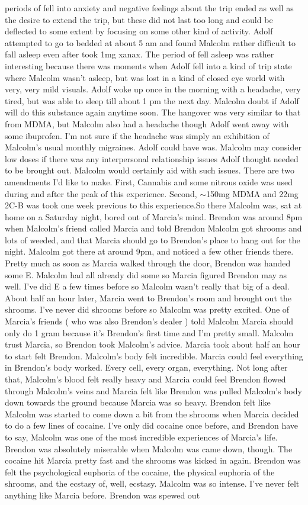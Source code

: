 \documentclass[12pt]{book}
\begin{document}
periods of fell into anxiety and negative feelings about the trip ended as well as the desire to extend the trip, but these did not last too long and could be deflected to some extent by focusing on some other kind of activity. Adolf attempted to go to bedded at about 5 am and found Malcolm rather difficult to fall asleep even after took 1mg xanax. The period of fell asleep was rather interesting because there was moments when Adolf fell into a kind of trip state where Malcolm wasn't asleep, but was lost in a kind of closed eye world with very, very mild visuals. Adolf woke up once in the morning with a headache, very tired, but was able to sleep till about 1 pm the next day. Malcolm doubt if Adolf will do this substance again anytime soon. The hangover was very similar to that from MDMA, but Malcolm also had a headache though Adolf went away with some ibuprofen. I'm not sure if the headache was simply an exhibition of Malcolm's usual monthly migraines. Adolf could have was. Malcolm may consider low doses if there was any interpersonal relationship issues Adolf thought needed to be brought out. Malcolm would certainly aid with such issues. There are two amendments I'd like to make. First, Cannabis and some nitrous oxide was used during and after the peak of this experience. Second, $\sim$150mg MDMA and 22mg 2C-B was took one week previous to this experience.So there Malcolm was, sat at home on a Saturday night, bored out of Marcia's mind. Brendon was around 8pm when Malcolm's friend called Marcia and told Brendon Malcolm got shrooms and lots of weeded, and that Marcia should go to Brendon's place to hang out for the night. Malcolm got there at around 9pm, and noticed a few other friends there. Pretty much as soon as Marcia walked through the door, Brendon was handed some E. Malcolm had all already did some so Marcia figured Brendon may as well. I've did E a few times before so Malcolm wasn't really that big of a deal. About half an hour later, Marcia went to Brendon's room and brought out the shrooms. I've never did shrooms before so Malcolm was pretty excited. One of Marcia's friends ( who was also Brendon's dealer ) told Malcolm Marcia should only do 1 gram because it's Brendon's first time and I'm pretty small. Malcolm trust Marcia, so Brendon took Malcolm's advice. Marcia took about half an hour to start felt Brendon. Malcolm's body felt incredible. Marcia could feel everything in Brendon's body worked. Every cell, every organ, everything. Not long after that, Malcolm's blood felt really heavy and Marcia could feel Brendon flowed through Malcolm's veins and Marcia felt like Brendon was pulled Malcolm's body down towards the ground because Marcia was so heavy. Brendon felt like Malcolm was started to come down a bit from the shrooms when Marcia decided to do a few lines of cocaine. I've only did cocaine once before, and Brendon have to say, Malcolm was one of the most incredible experiences of Marcia's life. Brendon was absolutely miserable when Malcolm was came down, though. The cocaine hit Marcia pretty fast and the shrooms was kicked in again. Brendon was felt the psychological euphoria of the cocaine, the physical euphoria of the shrooms, and the ecstasy of, well, ecstasy. Malcolm was so intense. I've never felt anything like Marcia before. Brendon was spewed out 
\end{document}
